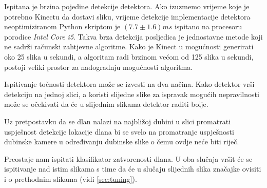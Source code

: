 \documentclass[times, utf8, diplomski, numeric]{fer}
\begin{document}
Ispitana je brzina pojedine detekcije detektora. Ako izuzmemo vrijeme koje je potrebno Kinectu da dostavi sliku, vrijeme detekcije implementacije detektora neoptimiziranom Python skriptom je $(7.7 \pm 1.6) ms$ ispitano na procesoru porodice \textit{Intel Core i5}. Takva brza detekcija posljedica je jednostavne metode koji ne sadrži računski zahtjevne algoritme. Kako je Kinect u mogućnosti generirati oko 25 slika u sekundi, a algoritam radi brzinom većom od 125 slika u sekundi, postoji veliki prostor za nadogradnju mogućnosti algoritma.

Ispitivanje točnosti detektora može se izvesti na dva načina. Kako detektor vrši detekciju na jednoj slici, a koristi slijedne slike za ispravak mogućih nepravilnosti može se očekivati da će u slijednim slikama detektor raditi bolje.

Uz pretpostavku da se dlan nalazi na najbližoj dubini u slici promatrati uspješnost detekcije lokacije dlana bi se svelo na promatranje uspješnosti dubinske kamere u određivanju dubinske slike o čemu ovdje neće biti riječ.

Preostaje nam ispitati klasifikator zatvorenosti dlana. U oba slučaja vršit će se ispitivanje nad istim slikama s time da će u slučaju slijednih slika značajke ovisiti i o prethodnim slikama (vidi \ref{sec:tuning}).
\end{document}
